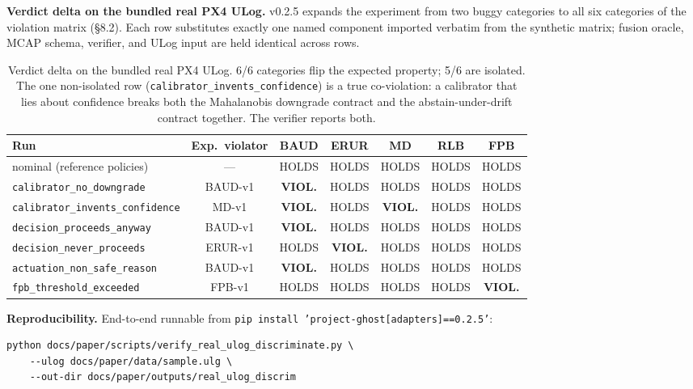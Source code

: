 \documentclass[11pt,a4paper]{article}
\begin{document}
\textbf{Verdict delta on the bundled real PX4 ULog.} v0.2.5
expands the experiment from two buggy categories to all six
categories of the violation matrix (\S8.2). Each row substitutes
exactly one named component imported verbatim from the synthetic
matrix; fusion oracle, MCAP schema, verifier, and ULog input are
held identical across rows.

\begin{table}[h]
\centering\small
\begin{tabular}{l c c c c c c}
\toprule
\textbf{Run} & \textbf{Exp.\ violator} & BAUD & ERUR & MD & RLB & FPB \\
\midrule
nominal (reference policies)              & ---     & HOLDS & HOLDS & HOLDS & HOLDS & HOLDS \\
\texttt{calibrator\_no\_downgrade}        & BAUD-v1 & \textbf{VIOL.} & HOLDS & HOLDS & HOLDS & HOLDS \\
\texttt{calibrator\_invents\_confidence}  & MD-v1   & \textbf{VIOL.} & HOLDS & \textbf{VIOL.} & HOLDS & HOLDS \\
\texttt{decision\_proceeds\_anyway}       & BAUD-v1 & \textbf{VIOL.} & HOLDS & HOLDS & HOLDS & HOLDS \\
\texttt{decision\_never\_proceeds}        & ERUR-v1 & HOLDS & \textbf{VIOL.} & HOLDS & HOLDS & HOLDS \\
\texttt{actuation\_non\_safe\_reason}     & BAUD-v1 & \textbf{VIOL.} & HOLDS & HOLDS & HOLDS & HOLDS \\
\texttt{fpb\_threshold\_exceeded}         & FPB-v1  & HOLDS & HOLDS & HOLDS & HOLDS & \textbf{VIOL.} \\
\bottomrule
\end{tabular}
\caption{Verdict delta on the bundled real PX4 ULog. 6/6 categories
flip the expected property; 5/6 are isolated. The one non-isolated
row (\texttt{calibrator\_invents\_confidence}) is a true
co-violation: a calibrator that lies about confidence breaks both
the Mahalanobis downgrade contract and the abstain-under-drift
contract together. The verifier reports both.}
\label{tab:realflight-discrim}
\end{table}

\textbf{Reproducibility.} End-to-end runnable from
\texttt{pip install 'project-ghost[adapters]==0.2.5'}:

\begin{lstlisting}
python docs/paper/scripts/verify_real_ulog_discriminate.py \
    --ulog docs/paper/data/sample.ulg \
    --out-dir docs/paper/outputs/real_ulog_discrim
\end{lstlisting}
\end{document}
